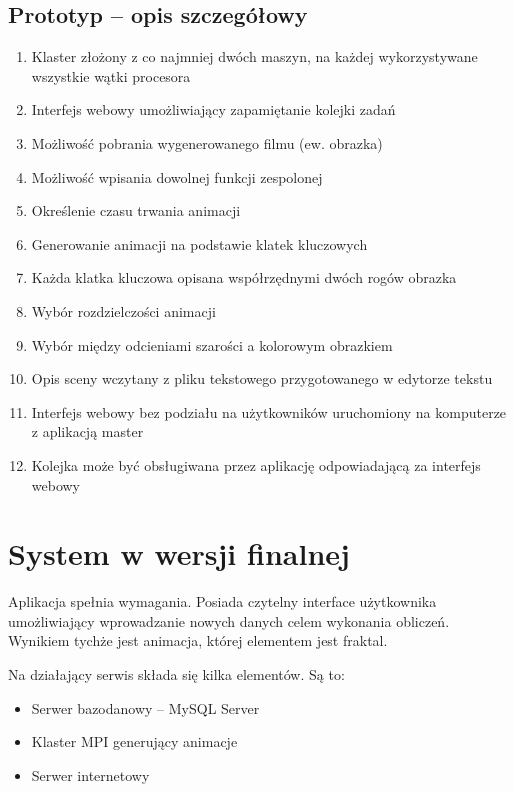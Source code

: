 \documentclass[a4paper]{article}
\begin{document}
\subsection{Prototyp -- opis szczegółowy}
\begin{enumerate}
\item Klaster złożony z co najmniej dwóch maszyn, na każdej wykorzystywane wszystkie wątki procesora
\item Interfejs webowy umożliwiający zapamiętanie kolejki zadań
\item Możliwość pobrania wygenerowanego filmu (ew. obrazka)
\item Możliwość wpisania dowolnej funkcji zespolonej
\item Określenie czasu trwania animacji
\item Generowanie animacji na podstawie klatek kluczowych
\item Każda klatka kluczowa opisana współrzędnymi dwóch rogów obrazka
\item Wybór rozdzielczości animacji
\item Wybór między odcieniami szarości a kolorowym obrazkiem
\item Opis sceny wczytany z pliku tekstowego przygotowanego  w edytorze tekstu
\item Interfejs webowy bez podziału na użytkowników uruchomiony na komputerze z aplikacją master
\item Kolejka może być obsługiwana przez aplikację odpowiadającą za interfejs webowy
\end{enumerate}
\newpage

\section{System w wersji finalnej}
Aplikacja spełnia wymagania. Posiada czytelny interface użytkownika umożliwiający wprowadzanie nowych danych celem wykonania obliczeń. Wynikiem tychże jest animacja, której elementem jest fraktal. 
\par
Na działający serwis składa się kilka elementów. Są to:
\begin{itemize}
\item Serwer bazodanowy -- MySQL Server
\item Klaster MPI generujący animacje
\item Serwer internetowy
\end{itemize}
\end{document}
